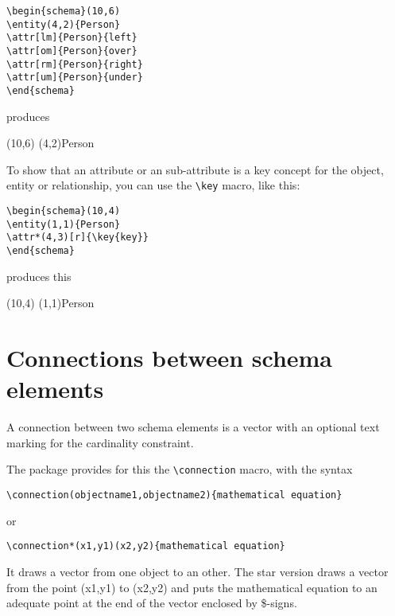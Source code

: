 \documentclass[a4paper,11pt]{article}
\begin{document}
\begin{verbatim}
\begin{schema}(10,6)
\entity(4,2){Person}
\attr[lm]{Person}{left}
\attr[om]{Person}{over}
\attr[rm]{Person}{right}
\attr[um]{Person}{under}
\end{schema}
\end{verbatim}

produces

\begin{schema}(10,6)
\entity(4,2){Person}
\end{schema}

To show that an attribute or an sub-attribute is a key concept for the object, entity or relationship,
you can use the \verb|\key| macro, like this:

\begin{verbatim}
\begin{schema}(10,4)
\entity(1,1){Person}
\attr*(4,3)[r]{\key{key}}
\end{schema}
\end{verbatim}

produces this

\begin{schema}(10,4)
\entity(1,1){Person}
\end{schema}

\section{Connections between schema elements}

A connection between two schema elements is a vector with an optional
text marking for the cardinality constraint.

The package provides for this the \verb|\connection| macro, with the syntax

\begin{verbatim}
\connection(objectname1,objectname2){mathematical equation}
\end{verbatim}

or

\begin{verbatim}
\connection*(x1,y1)(x2,y2){mathematical equation}
\end{verbatim}

It draws a vector from one object to an other. The star version draws 
a vector from the point (x1,y1) to (x2,y2) and puts the mathematical 
equation to an adequate point at the end of the vector enclosed by \$-signs. 
\end{document}
